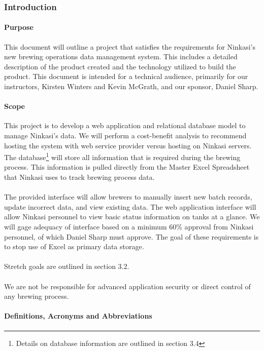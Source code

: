 \subsubsection{Introduction}
	\paragraph{Purpose}
		This document will outline a project that satisfies the requirements for Ninkasi's new brewing operations data management system.
		This includes a detailed description of the product created and the technology utilized to build the product.
		This document is intended for a technical audience, primarily for our instructors, Kirsten Winters and Kevin McGrath, and our sponsor, Daniel Sharp.

	\paragraph{Scope}

		This project is to develop a web application and relational database model to manage Ninkasi's data.
		We will perform a cost-benefit analysis to recommend hosting the system with web service provider versus hosting on Ninkasi servers.
		The database\footnote{Details on database information are outlined in section 3.4} will store all information that is required during the brewing process.
        This information is pulled directly from the Master Excel Spreadsheet that Ninkasi uses to track brewing process data.
        \\
        \\
		The provided interface will allow brewers to manually insert new batch records, update incorrect data, and view existing data.
		The web application interface will allow Ninkasi personnel to view basic status information on tanks at a glance.
		We will gage adequacy of interface based on a minimum 60\% approval from Ninkasi personnel, of which Daniel Sharp must approve.
		The goal of these requirements is to stop use of Excel as primary data storage.
		\\
		\\
		Stretch goals are outlined in section 3.2.
		\\
		\\
		We are not be responsible for advanced application security or direct control of any brewing process.

	\paragraph{Definitions, Acronyms and Abbreviations}

